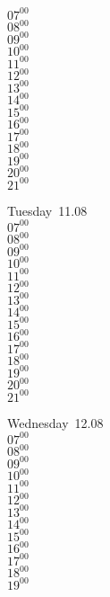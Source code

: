 \documentclass[11pt,a4paper]{book}\usepackage[]{graphicx}\usepackage[]{color}
\begin{document}
{{{{{\begin{tcolorbox}
{ 
$07^{00}$\\
$08^{00}$\\
$09^{00}$\\
$10^{00}$\\
$11^{00}$\\
$12^{00}$\\
$13^{00}$\\
$14^{00}$\\
$15^{00}$\\
$16^{00}$\\
$17^{00}$\\
$18^{00}$\\
$19^{00}$\\
$20^{00}$\\
$21^{00}$}\\
\end{tcolorbox}
%
\begin{tcolorbox}
Tuesday~11.08\\
{ 
$07^{00}$\\
$08^{00}$\\
$09^{00}$\\
$10^{00}$\\
$11^{00}$\\
$12^{00}$\\
$13^{00}$\\
$14^{00}$\\
$15^{00}$\\
$16^{00}$\\
$17^{00}$\\
$18^{00}$\\
$19^{00}$\\
$20^{00}$\\
$21^{00}$}\\
\end{tcolorbox}
%
\begin{tcolorbox}
Wednesday~12.08\\
{ 
$07^{00}$\\
$08^{00}$\\
$09^{00}$\\
$10^{00}$\\
$11^{00}$\\
$12^{00}$\\
$13^{00}$\\
$14^{00}$\\
$15^{00}$\\
$16^{00}$\\
$17^{00}$\\
$18^{00}$\\
$19^{00}$\\
}
\end{tcolorbox}}}}}}
\end{document}
